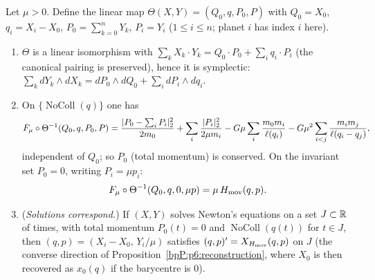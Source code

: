 \begin{proposition}\label{bpP:p6:reduction}
Let $\mu>0$. Define the linear map $\Theta(X,Y)=(Q_0,q,P_0,P)$ with $Q_0=X_0$, $q_i=X_i-X_0$, $P_0=\sum_{k=0}^nY_k$, $P_i=Y_i$ ($1\le i\le n$; planet $i$ has index $i$ here).
\begin{enumerate}[label=(\alph*)]
\item $\Theta$ is a linear isomorphism with $\sum_kX_k\cdot Y_k=Q_0\cdot P_0+\sum_iq_i\cdot P_i$ (the canonical pairing is preserved), hence it is symplectic: $\sum_kdY_k\wedge dX_k=dP_0\wedge dQ_0+\sum_idP_i\wedge dq_i$.
\item On $\{\operatorname{NoColl}(q)\}$ one has
\[F_\mu\circ\Theta^{-1}(Q_0,q,P_0,P)=\frac{\lvert P_0-\sum_iP_i\rvert_2^2}{2m_0}+\sum_i\frac{\lvert P_i\rvert_2^2}{2\mu m_i}-G\mu\sum_i\frac{m_0m_i}{\ell(q_i)}-G\mu^2\sum_{i<j}\frac{m_im_j}{\ell(q_i-q_j)},\]
independent of $Q_0$; so $P_0$ (total momentum) is conserved. On the invariant set $P_0=0$, writing $P_i=\mu p_i$:
\[F_\mu\circ\Theta^{-1}(Q_0,q,0,\mu p)=\mu\,H_{\rm mov}(q,p).\]
\item (\emph{Solutions correspond.}) If $(X,Y)$ solves Newton's equations on a set $J\subset\mathbb{R}$ of times, with total momentum $P_0(t)=0$ and $\operatorname{NoColl}(q(t))$ for $t\in J$, then $(q,p)=(X_i-X_0,\,Y_i/\mu)$ satisfies $(q,p)'=X_{H_{\rm mov}}(q,p)$ on $J$ (the converse direction of Proposition~\ref{bpP:p6:reconstruction}, where $X_0$ is then recovered as $x_0(q)$ if the barycentre is $0$).
\end{enumerate}
\end{proposition}
